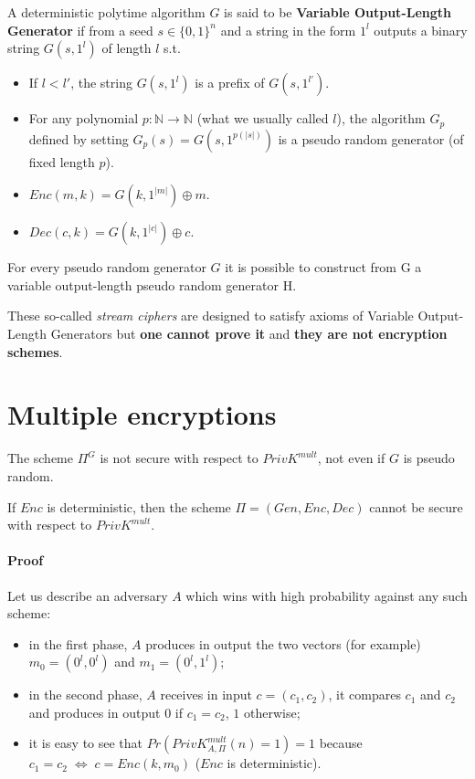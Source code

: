 \documentclass[../main]{subfiles}
\begin{document}
\begin{definition}
    A deterministic polytime algorithm $G$ is said to be \textbf{Variable Output-Length Generator} if from a seed $s \in{} \{0,1\}^n$ and a string in the form $1^l$ outputs a binary string $G(s,1^l)$ of length $l$ s.t.
    \begin{itemize}
        \item If $l < l'$, the string $G(s,1^l)$ is a prefix of $G(s,1^{l'})$.
        \item For any polynomial $p: \mathbb{N} \rightarrow{} \mathbb{N}$ (what we usually called $l$), the algorithm $G_p$ defined by setting $G_p(s)=G(s,1^{p(|s|)})$ is a pseudo random generator (of fixed length $p$).
        \item $Enc(m,k) = G(k, 1^{|m|}) \oplus m$.
        \item $Dec(c,k) = G(k, 1^{|c|}) \oplus c$.
    \end{itemize}
\end{definition}

\begin{lemma}
    For every pseudo random generator $G$ it is possible to construct from G a variable output-length pseudo random generator H.
\end{lemma}
\noindent
These so-called \textit{stream ciphers} are designed to satisfy axioms of Variable Output-Length Generators but \textbf{one cannot prove it} and \textbf{they are not encryption schemes}.

\section{Multiple encryptions}
\begin{lemma}
    The scheme $\Pi^G$ is not secure with respect to $PrivK^{mult}$, not even if $G$ is pseudo random.
\end{lemma}

\begin{theorem}
    If $Enc$ is deterministic, then the scheme $\Pi = (Gen, Enc, Dec)$ cannot be secure with respect to $PrivK^{mult}$.
\end{theorem}
\paragraph{Proof}
Let us describe an adversary $A$ which wins with high probability against any such scheme:
\begin{itemize}
    \item in the first phase, $A$ produces in output the two vectors (for example) $m_0 = (0^l, 0^l)$ and $m_1 = (0^l, 1^l)$;
    \item in the second phase, $A$ receives in input $c = (c_1, c_2)$, it compares $c_1$ and $c_2$ and produces in output $0$ if $c_1 = c_2$, $1$ otherwise;
    \item it is easy to see that $Pr(PrivK^{mult}_{A,\Pi}(n) = 1) = 1$ because $c_1 = c_2 \; \Leftrightarrow{} \; c = Enc(k,m_0)$ ($Enc$ is deterministic).
\end{itemize}
\end{document}
